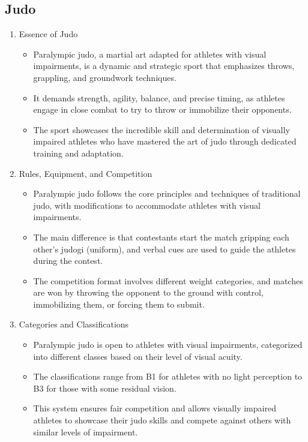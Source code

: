 \subsection{Judo}

\begin{enumerate}

\item Essence of Judo
    \begin{itemize}
    \item Paralympic judo, a martial art adapted for athletes with visual impairments, is a dynamic and strategic sport that emphasizes throws, grappling, and groundwork techniques. 
    \item It demands strength, agility, balance, and precise timing, as athletes engage in close combat to try to throw or immobilize their opponents. 
    \item The sport showcases the incredible skill and determination of visually impaired athletes who have mastered the art of judo through dedicated training and adaptation.
    \end{itemize}

\item Rules, Equipment, and Competition
    \begin{itemize}
    \item Paralympic judo follows the core principles and techniques of traditional judo, with modifications to accommodate athletes with visual impairments. 
    \item The main difference is that contestants start the match gripping each other's judogi (uniform), and verbal cues are used to guide the athletes during the contest. 
    \item The competition format involves different weight categories, and matches are won by throwing the opponent to the ground with control, immobilizing them, or forcing them to submit.
    \end{itemize}

\item Categories and Classifications
    \begin{itemize}
    \item Paralympic judo is open to athletes with visual impairments, categorized into different classes based on their level of visual acuity. 
    \item The classifications range from B1 for athletes with no light perception to B3 for those with some residual vision. 
    \item This system ensures fair competition and allows visually impaired athletes to showcase their judo skills and compete against others with similar levels of impairment. 
    \end{itemize}

\end{enumerate}